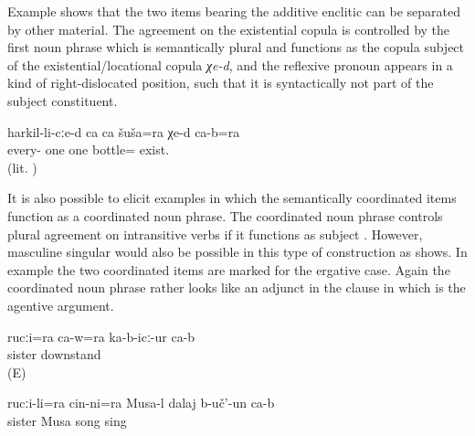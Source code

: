 Example  shows that the two items bearing the additive enclitic  can be separated by other material. The agreement on the existential copula is controlled by the first noun phrase  which is semantically plural and functions as the copula subject of the existential\slash locational copula \textit{χe-d}, and the reflexive pronoun appears in a kind of right-dislocated position, such that it is syntactically not part of the subject constituent. 
%
\begin{exe}
	\ex	\label{ex:‎Everybody is with a bottle in their hands. (lit. There is one bottle each in everybody's (hand), and they also.)}
	\gll	harkil-li-cːe-d	ca	ca	šuša=ra	χe-d	ca-b=ra\\
		every-	one	one bottle=	exist.		\\
	\glt	{} (lit. )
\end{exe}
%
It is also possible to elicit examples in which the semantically coordinated items function as a coordinated noun phrase. The coordinated noun phrase controls plural agreement on intransitive verbs if it functions as subject . However, masculine singular would also be possible in this type of construction as  shows. In example  the two coordinated items are marked for the ergative case. Again the coordinated noun phrase rather looks like an adjunct in the clause in which  is the agentive argument.
%
\begin{exe}
	\ex	\label{ex:‎He and (his) sister were standing there}
	\gll	rucːi=ra	ca-w=ra	ka-b-icː-ur	ca-b\\
		sister		downstand	\\
	\glt	{} (E)

	\ex	\label{ex:Musa sang a song together with his sister}
	\gll	rucːi-li=ra	cin-ni=ra	Musa-l	dalaj	b-uč'-un	ca-b\\
		sister		Musa	song	sing	\\
	\glt	{}
\end{exe}

